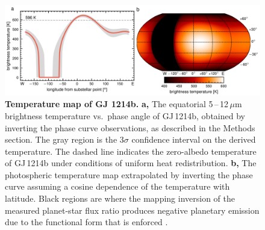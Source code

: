 \documentclass[pdflatex,sn-standardnature]{sn-jnl}%
\begin{document}
\begin{figure}[h]
    \centering
    \includegraphics[width=1.0\textwidth]{wl_map_0409_centerd_0.png}
    \caption{\textbf{Temperature map of GJ 1214b.} \textbf{a,} The equatorial 5\,--\,12\,$\mu$m brightness temperature vs.\ phase angle of GJ\,1214b, obtained by inverting the phase curve observations, as described in the Methods section.  The gray region is the 3$\sigma$ confidence interval on the derived temperature.  The dashed line indicates the zero-albedo temperature of GJ\,1214b under conditions of uniform heat redistribution.  \textbf{b,} The photospheric temperature map extrapolated by inverting the phase curve assuming a cosine dependence of the temperature with latitude.  Black regions are where the mapping inversion of the measured planet-star flux ratio produces negative planetary emission due to the functional form that is enforced \cite{keating17}.}
    \label{fig:T_map} 
\end{figure}




\end{document}

